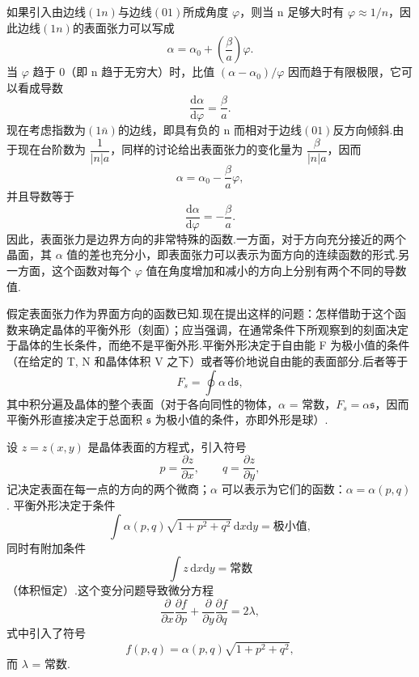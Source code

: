 如果引入由边线$(1n)$与边线$(01)$所成角度 $\varphi$，则当 n 足够大时有 $\varphi\approx1/n$，因此边线$(1n)$的表面张力可以写成
\begin{equation*}
  \alpha=\alpha_0+\left(\frac{\beta}{a}\right)\varphi.
\end{equation*}
当 $\varphi$ 趋于 0（即 n 趋于无穷大）时，比值 $(\alpha-\alpha_0)/\varphi$ 因而趋于有限极限，它可以看成导数
\begin{equation*}
  \frac{\mathrm{d}\alpha}{\mathrm{d}\varphi}=\frac{\beta}{a}.
\end{equation*}
现在考虑指数为$(1\bar{n})$的边线，即具有负的 n 而相对于边线$(01)$反方向倾斜.由于现在台阶数为 $\dfrac{1}{|n|a}$，同样的讨论给出表面张力的变化量为 $\dfrac{\beta}{|n|a}$，因而
\begin{equation*}
  \alpha=\alpha_0-\frac{\beta}{a}\varphi,
\end{equation*}
并且导数等于
\begin{equation*}
  \frac{\mathrm{d}\alpha}{\mathrm{d}\varphi}=-\frac{\beta}{a}.
\end{equation*}
因此，表面张力是边界方向的非常特殊的函数.一方面，对于方向充分接近的两个晶面，其 $\alpha$ 值的差也充分小，即表面张力可以表示为面方向的连续函数的形式.另一方面，这个函数对每个 $\varphi$ 值在角度增加和减小的方向上分别有两个不同的导数值.

假定表面张力作为界面方向的函数已知.现在提出这样的问题：怎样借助于这个函数来确定晶体的平衡外形（刻面）；应当强调，在通常条件下所观察到的刻面决定于晶体的生长条件，而绝不是平衡外形.平衡外形决定于自由能 F 为极小值的条件（在给定的 T, N 和晶体体积 V 之下）或者等价地说自由能的表面部分.后者等于
\begin{equation*}
  F_s=\oint\alpha\,\mathrm{d}\mathfrak{s},
\end{equation*}
其中积分遍及晶体的整个表面（对于各向同性的物体，$\alpha$ = 常数，$F_s=\alpha\mathfrak{s}$，因而平衡外形直接决定于总面积 $\mathfrak{s}$ 为极小值的条件，亦即外形是球）.

设 $z=z(x,y)$ 是晶体表面的方程式，引入符号
\begin{equation*}
  p=\frac{\partial z}{\partial x},\qquad q=\frac{\partial z}{\partial y},
\end{equation*}
记决定表面在每一点的方向的两个微商；$\alpha$ 可以表示为它们的函数：$\alpha=\alpha(p,q)$. 平衡外形决定于条件
\begin{equation}
  \int\alpha(p,q)\sqrt{1+p^2+q^2}\,\mathrm{d}x\mathrm{d}y=\text{极小值},
\end{equation}
同时有附加条件
\begin{equation}
  \int z\,\mathrm{d}x\mathrm{d}y=\text{常数}
\end{equation}
（体积恒定）.这个变分问题导致微分方程
\begin{equation}
  \frac{\partial}{\partial x}\frac{\partial f}{\partial p}
  +\frac{\partial}{\partial y}\frac{\partial f}{\partial q}=2\lambda,
\end{equation}
式中引入了符号
\begin{equation}
  f(p,q)=\alpha(p,q)\sqrt{1+p^2+q^2},
\end{equation}
而 $\lambda$ = 常数.

